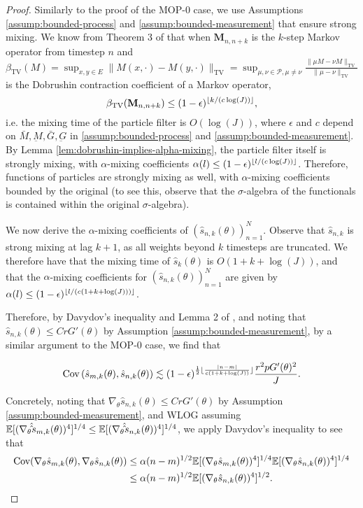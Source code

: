 \begin{proof}
Similarly to the proof of the MOP-$0$ case, we use Assumptions \ref{assump:bounded-process} and \ref{assump:bounded-measurement} that ensure strong mixing. We know from Theorem 3 of \cite{karjalainen23} that when $\textbf{M}_{n,n+k}$ is the $k$-step Markov operator from timestep $n$ and $\beta_{\text{TV}}(M) = \sup _{x, y \in E}\|M(x, \cdot)-M(y, \cdot)\|_{\mathrm{TV}}=\sup _{\mu, \nu \in \mathcal{P}, \mu \neq \nu} \frac{\|\mu M-\nu M\|_{\mathrm{TV}}}{\|\mu-\nu\|_{\mathrm{TV}}}$ is the Dobrushin contraction coefficient of a Markov operator, 
$$\beta_{\text{TV}}(\textbf{M}_{n,n+k}) \leq (1-\epsilon)^{\lfloor k/(c\log(J)) \rfloor},$$
i.e. the mixing time of the particle filter is $O(\log(J))$, where $\epsilon$ and $c$ depend on $\bar{M}, \underbar{M}, \bar{G}, \underbar{G}$ in \ref{assump:bounded-process} and \ref{assump:bounded-measurement}. By Lemma \ref{lem:dobrushin-implies-alpha-mixing}, the particle filter itself is strongly mixing, with $\alpha$-mixing coefficients $\alpha(l) \leq (1-\epsilon)^{\lfloor l/(c\log(J)) \rfloor}$. Therefore, functions of particles are strongly mixing as well, with $\alpha$-mixing coefficients bounded by the original (to see this, observe that the $\sigma$-algebra of the functionals is contained within the original $\sigma$-algebra).

We now derive the $\alpha$-mixing coefficients of $(\hat s_{n,k}(\theta))_{n=1}^N$. Observe that $\hat s_{n,k}$ is strong mixing at lag $k+1$, as all weights beyond $k$ timesteps are truncated. We therefore have that the mixing time of $\hat s_k(\theta)$ is $O(1+k+\log(J))$, and that the $\alpha$-mixing coefficients for $(\hat s_{n,k}(\theta))_{n=1}^N$ are given by $\alpha(l) \leq (1-\epsilon)^{\lfloor l/(c(1+k+\log(J))) \rfloor}$.

Therefore, by Davydov's inequality and Lemma 2 of \cite{karjalainen23}, and noting that $\hat s_{n,k}(\theta) \leq CrG'(\theta)$ by Assumption \ref{assump:bounded-measurement}, by a similar argument to the MOP-0 case, we find that 

$$\text{Cov}\left(\hat s_{m,k}(\theta), \hat s_{n,k}(\theta)\right) \lesssim (1-\epsilon)^{\frac{1}{2}\lfloor \frac{|n-m|}{c(1+k+\log(J))} \rfloor}\frac{r^2pG'(\theta)^2}{J}.$$

Concretely, noting that $\nabla_\theta\hat s_{n,k}(\theta)\leq CrG'(\theta)$ by Assumption \ref{assump:bounded-measurement}, and WLOG assuming $\mathbb{E}[(\nabla_\theta\hat\hat s_{m,k}(\theta))^4]^{1/4}\leq\mathbb{E}[(\nabla_\theta\hat\hat s_{n,k}(\theta))^4]^{1/4}$, we apply Davydov's inequality to see that
\begin{align}
    \text{Cov}(\nabla_\theta\hat s_{m,k}(\theta), \nabla_\theta\hat s_{n,k}(\theta)) 
    &\leq \alpha(n-m)^{1/2}\mathbb{E}[(\nabla_\theta\hat s_{m,k}(\theta))^4]^{1/4}\mathbb{E}[(\nabla_\theta\hat s_{n,k}(\theta))^4]^{1/4}\\
    &\leq \alpha(n-m)^{1/2}\mathbb{E}[(\nabla_\theta\hat s_{n,k}(\theta))^4]^{1/2}.
\end{align}


\end{proof}
